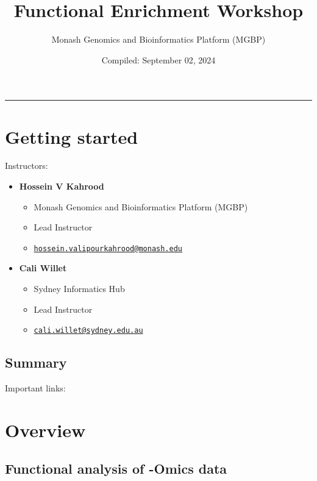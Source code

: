 \documentclass[
]{book}
\title{Functional Enrichment Workshop}
\author{Monash Genomics and Bioinformatics Platform (MGBP)}
\date{Compiled: September 02, 2024}
\providecommand{\tightlist}{%
  \setlength{\itemsep}{0pt}\setlength{\parskip}{0pt}}
\begin{document}
\maketitle

{
\setcounter{tocdepth}{1}
\tableofcontents
}
\begin{center}\rule{0.5\linewidth}{0.5pt}\end{center}

\chapter{Getting started}\label{getting-started}

Instructors:

\begin{itemize}
\tightlist
\item
  \textbf{Hossein V Kahrood}

  \begin{itemize}
  \tightlist
  \item
    Monash Genomics and Bioinformatics Platform (MGBP)
  \item
    Lead Instructor
  \item
    \href{mailto:hossein.valipourkahrood@monash.edu}{\nolinkurl{hossein.valipourkahrood@monash.edu}}
  \end{itemize}
\item
  \textbf{Cali Willet}

  \begin{itemize}
  \tightlist
  \item
    Sydney Informatics Hub
  \item
    Lead Instructor
  \item
    \href{mailto:cali.willet@sydney.edu.au}{\nolinkurl{cali.willet@sydney.edu.au}}
  \end{itemize}
\end{itemize}

\section{Summary}\label{summary}

Important links:

\chapter{Overview}\label{overview}

\section{Functional analysis of -Omics data}\label{functional-analysis-of--omics-data}
\end{document}
